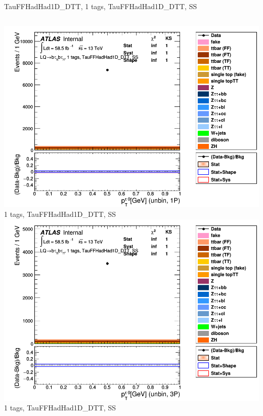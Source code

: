\begin{frame}{TauFFHadHad1D\_DTT, 1 tags, TauFFHadHad1D\_DTT, SS}
\begin{columns}[c]
    \centering\includegraphics[width=\textwidth]{C_1tag2pjet_0ptv_SS_UnbinLeadTau1P}\\
    1 tags, TauFFHadHad1D\_DTT, SS
    \centering\includegraphics[width=\textwidth]{C_1tag2pjet_0ptv_SS_UnbinLeadTau3P}\\
    1 tags, TauFFHadHad1D\_DTT, SS
  \end{columns}
\end{frame}


